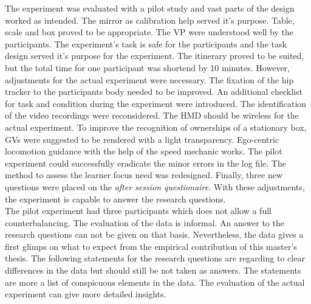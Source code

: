 The experiment was evaluated with a pilot study and vast parts of the design worked as intended. The mirror as calibration help served it's purpose. Table, scale and box proved to be appropriate. The VP were understood well by the participants. The experiment's task is safe for the participants and the task design served it's purpose for the experiment. The itinerary proved to be suited, but the total time for one participant was shortend by 10 minutes. However, adjustments for the actual experiment were necessary. The fixation of the hip tracker to the participants body needed to be improved. An additional checklist for task and condition during the experiment were introduced. The identification of the video recordings were reconsidered. The HMD should be wireless for the actual experiment. To improve the recognition of ownerships of a stationary box, GVs were suggested to be rendered with a light transparency. Ego-centric locomotion guidance with the help of the speed mechanic works. The pilot experiment could successfully eradicate the minor errors in the log file. The method to assess the learner focus need was redesigned. Finally, three new questions were placed on the \textit{after session questionaire}. With these adjustments, the experiment is capable to answer the research questions.\\

The pilot experiment had three participants which does not allow a full counterbalancing. The evaluation of the data is informal. An answer to the research questions can not be given on that basis. Nevertheless, the data gives a first glimps on what to expect from the empirical contribution of this master's thesis. The following statements for the research questions are regarding to clear differences in the data but should still be not taken as answers. The statements are more a list of conspicuous elements in the data. The evaluation of the actual experiment can give more detailed insights.


